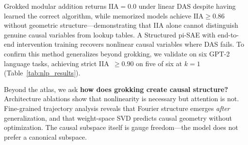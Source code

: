 \documentclass{article}
\newcommand{\IIA}{\mathrm{IIA}}
\begin{document}
Grokked modular addition returns $\IIA = 0.0$ under linear DAS despite having
learned the correct algorithm, while memorized models achieve
$\IIA \geq 0.86$ without geometric structure---demonstrating that IIA alone
cannot distinguish genuine causal variables from lookup tables.
A Structured pi-SAE with end-to-end intervention training recovers nonlinear
causal variables where DAS fails. To confirm this method generalizes beyond
grokking, we validate on six GPT-2 language tasks, achieving strict
IIA~$\geq 0.90$ on five of six at $k{=}1$ (Table~\ref{tab:nlp_results}).

Beyond the atlas, we ask \textbf{how does grokking create causal structure?}
Architecture ablations show that nonlinearity is necessary but attention is
not. Fine-grained trajectory analysis reveals that Fourier structure emerges
\emph{after} generalization, and that weight-space SVD predicts causal
geometry without optimization. The causal subspace itself is gauge
freedom---the model does not prefer a canonical subspace.
\end{document}
